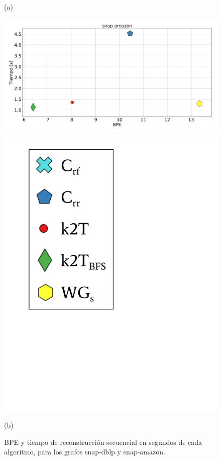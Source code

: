 \begin{figure}
\begin{minipage}{1\textwidth}
    			(a)		
    	\end{minipage}
    	
       	\begin{minipage}{1\textwidth}
    			\centering
    			\begin{minipage}{0.8\textwidth}
    				\centering
    				\includegraphics[width=1\linewidth]{img/bpeTimes/secuencial/snap-amazon.pdf}
    			\end{minipage}
    			\begin{minipage}{0.15\textwidth}
    				\centering
    				\includegraphics[scale=.24, clip, trim=70 290 290 30]{img/bpeTimes/labelSec.pdf}
    			\end{minipage}
    			
    			(b)		
    	\end{minipage}
    	
    \caption{BPE y tiempo de reconstrucción secuencial en segundos de cada algoritmo, para los grafos snap-dblp y snap-amazon.}
    \label{fig:bpetSec3}
\end{figure}
